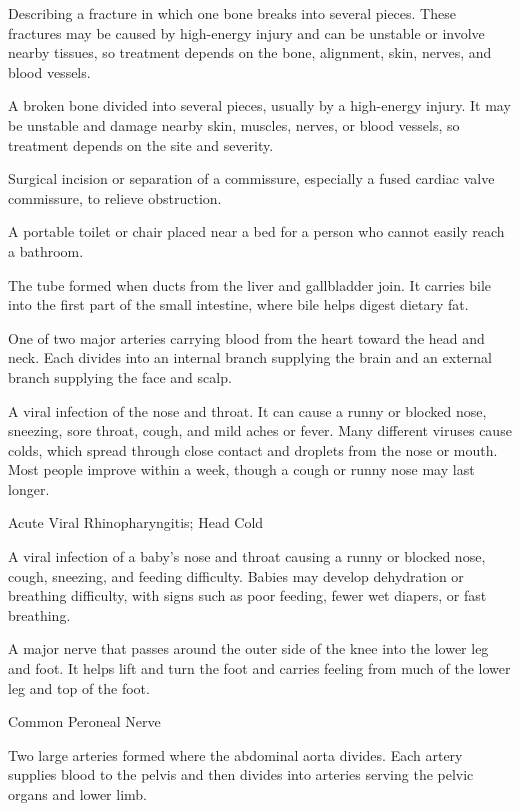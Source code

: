  Describing a fracture in which one bone breaks into several pieces. These fractures may be caused by high-energy injury and can be unstable or involve nearby tissues, so treatment depends on the bone, alignment, skin, nerves, and blood vessels.

 A broken bone divided into several pieces, usually by a high-energy injury. It may be unstable and damage nearby skin, muscles, nerves, or blood vessels, so treatment depends on the site and severity.

 Surgical incision or separation of a commissure, especially a fused cardiac valve
commissure, to relieve obstruction.

 A portable toilet or chair placed near a bed for a person who cannot easily reach a bathroom.

 The tube formed when ducts from the liver and gallbladder join. It carries bile into the first part of the small intestine, where bile helps digest dietary fat.

 One of two major arteries carrying blood from the heart toward the head and neck. Each divides into an internal branch supplying the brain and an external branch supplying the face and scalp.

 A viral infection of the nose and throat. It can cause a runny or blocked nose, sneezing, sore throat, cough, and mild aches or fever. Many different viruses cause colds, which spread through close contact and droplets from the nose or mouth. Most people improve within a week, though a cough or runny nose may last longer.

\synonyms
Acute Viral Rhinopharyngitis; Head Cold


 A viral infection of a baby's nose and throat causing a runny or blocked nose, cough, sneezing, and feeding difficulty. Babies may develop dehydration or breathing difficulty, with signs such as poor feeding, fewer wet diapers, or fast breathing.

 A major nerve that passes around the outer side of the knee into the lower leg and foot. It helps lift and turn the foot and carries feeling from much of the lower leg and top of the foot.

\synonyms
Common Peroneal Nerve

 Two large arteries formed where the abdominal aorta divides. Each artery supplies blood to the pelvis and then divides into arteries serving the pelvic organs and lower limb.

